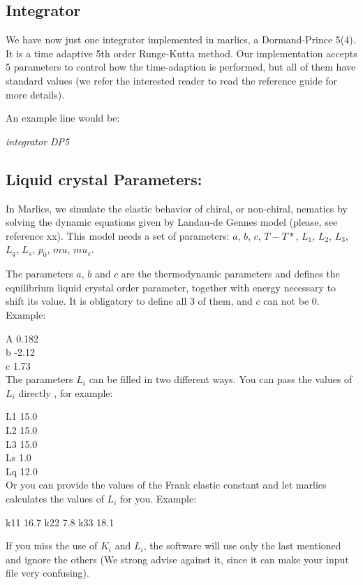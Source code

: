\documentclass{article}
\newcommand{\consoleline}[2][0.5cm]
{\vspace{#1}
\textit{{#2}}
\vspace{#1}
}
\begin{document}
\subsection{Integrator}

 We have now just one integrator implemented in marlics, a Dormand-Prince 5(4). It is a time adaptive 5th order Runge-Kutta method. Our implementation accepts 5 parameters to control how the time-adaption is performed, but all of them have standard values (we refer the interested reader to read the reference guide for more details).

 An example line would be:

 \consoleline{integrator DP5}

\subsection{Liquid crystal Parameters:}

 In Marlics, we simulate the elastic behavior of chiral, or non-chiral, nematics by solving the dynamic equations given by Landau-de Gennes 
model (please, see reference xx). This model needs a set of parameters: $a$, $b$, $c$, $T-T*$, $L_1$, $L_2$, $L_3$, $L_q$, $L_s$, $p_0$, $mu$, $mu_s$.

The parameters $a$, $b$ and $c$ are the thermodynamic parameters and defines the equilibrium liquid crystal order parameter, together with energy necessary to shift its value. It is obligatory to define all 3 of them, and $c$ can not be 0.
Example:

A  0.182\\
b -2.12\\
c 1.73\\


The parameters $L_i$ can be filled in two different ways. You can pass the values of $L_i$ directly , for example:

L1  15.0\\
L2  15.0\\
L3  15.0\\
Ls  1.0 \\
Lq  12.0\\

Or you can provide the values of the Frank elastic constant and let marlics calculates the values of $L_i$ for you. Example:

k11 16.7
k22 7.8
k33 18.1

If you miss the use of $K_i$ and $L_i$, the software will use only the last mentioned and ignore the others (We strong advise against it, since it can make your input file very confusing).
\end{document}
